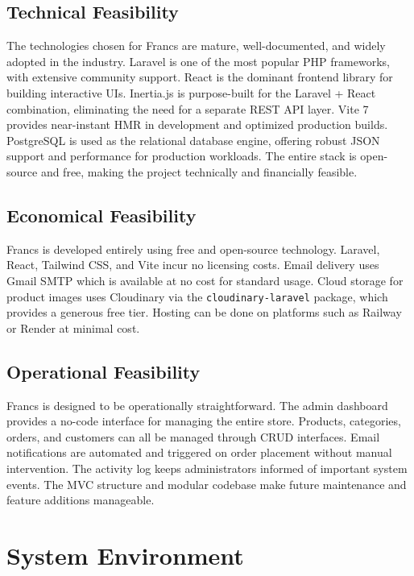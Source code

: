 \subsection{Technical Feasibility}
The technologies chosen for Francs are mature, well-documented, and widely adopted in the industry. Laravel is one of the most popular PHP frameworks, with extensive community support. React is the dominant frontend library for building interactive UIs. Inertia.js is purpose-built for the Laravel + React combination, eliminating the need for a separate REST API layer. Vite 7 provides near-instant HMR in development and optimized production builds. PostgreSQL is used as the relational database engine, offering robust JSON support and performance for production workloads. The entire stack is open-source and free, making the project technically and financially feasible.

\subsection{Economical Feasibility}
Francs is developed entirely using free and open-source technology. Laravel, React, Tailwind CSS, and Vite incur no licensing costs. Email delivery uses Gmail SMTP which is available at no cost for standard usage. Cloud storage for product images uses Cloudinary via the \texttt{cloudinary-laravel} package, which provides a generous free tier. Hosting can be done on platforms such as Railway or Render at minimal cost.

\subsection{Operational Feasibility}
Francs is designed to be operationally straightforward. The admin dashboard provides a no-code interface for managing the entire store. Products, categories, orders, and customers can all be managed through CRUD interfaces. Email notifications are automated and triggered on order placement without manual intervention. The activity log keeps administrators informed of important system events. The MVC structure and modular codebase make future maintenance and feature additions manageable.

\section{System Environment}

